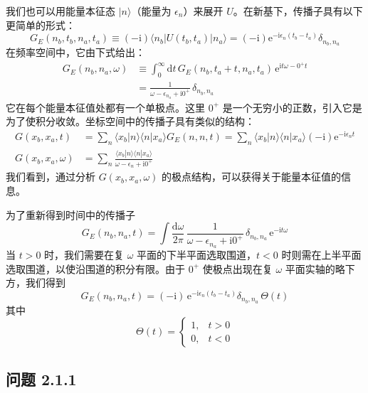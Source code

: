 我们也可以用能量本征态 $|n\rangle$（能量为 $\epsilon_n$）来展开 $U$。在新基下，传播子具有以下更简单的形式：
\begin{equation*}
G_E(n_b,t_b,n_a,t_a) \equiv (-\mathrm{i})\langle n_b|U(t_b,t_a)|n_a\rangle = (-\mathrm{i})\mathrm{e}^{-\mathrm{i}\epsilon_n(t_b-t_a)}\delta_{n_b,n_a}
\end{equation*}
在频率空间中，它由下式给出：
\begin{align*}
G_E(n_b,n_a,\omega) &\equiv \int_0^{\infty} \mathrm{d}t\, G_E(n_b,t_a+t,n_a,t_a)\,\mathrm{e}^{\mathrm{i}t\omega-0^+t}\\
&= \frac{1}{\omega-\epsilon_{n_a}+\mathrm{i}0^+}\,\delta_{n_b,n_a}
\end{align*}
它在每个能量本征值处都有一个单极点。这里 $0^+$ 是一个无穷小的正数，引入它是为了使积分收敛。坐标空间中的传播子具有类似的结构：
\begin{align*}
G(x_b,x_a,t) &= \sum_n \langle x_b|n\rangle\langle n|x_a\rangle G_E(n,n,t) = \sum_n \langle x_b|n\rangle\langle n|x_a\rangle(-\mathrm{i})\mathrm{e}^{-\mathrm{i}\epsilon_n t}\\
G(x_b,x_a,\omega) &= \sum_n \frac{\langle x_b|n\rangle\langle n|x_a\rangle}{\omega-\epsilon_n+\mathrm{i}0^+}
\end{align*}
我们看到，通过分析 $G(x_b,x_a,\omega)$ 的极点结构，可以获得关于能量本征值的信息。

为了重新得到时间中的传播子
\begin{equation*}
G_E(n_b,n_a,t) = \int \frac{\mathrm{d}\omega}{2\pi}\, \frac{1}{\omega-\epsilon_{n_a}+\mathrm{i}0^+}\,\delta_{n_b,n_a}\,\mathrm{e}^{-\mathrm{i}t\omega}
\end{equation*}
当 $t>0$ 时，我们需要在复 $\omega$ 平面的下半平面选取围道，$t<0$ 时则需在上半平面选取围道，以使沿围道的积分有限。由于 $0^+$ 使极点出现在复 $\omega$ 平面实轴的略下方，我们得到
\begin{equation*}
G_E(n_b,n_a,t) = (-\mathrm{i})\,\mathrm{e}^{-\mathrm{i}\epsilon_n(t_b-t_a)}\delta_{n_b,n_a}\,\Theta(t)
\end{equation*}
其中
\begin{equation*}
\Theta(t) = \left\{\begin{array}{ll} 1, & t>0\\ 0, & t<0 \end{array}\right. \tag{2.1.3}
\end{equation*}

\subsection*{问题 2.1.1}

